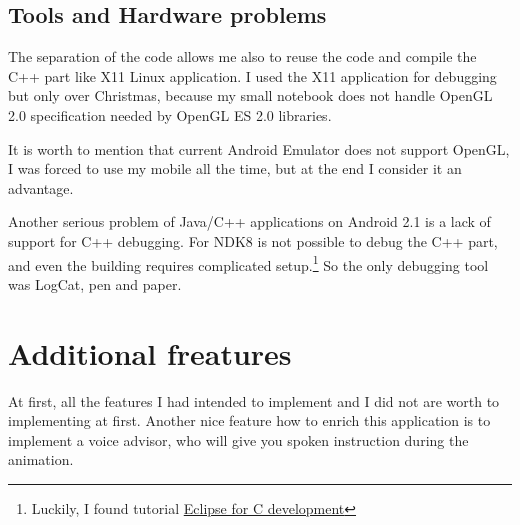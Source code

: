 \subsection*{Tools and Hardware problems} %
The separation of the code allows me also to reuse the code and compile 
the C++ part like X11 Linux application. I used the X11 application for debugging
but only over Christmas, because my small notebook does not handle OpenGL 2.0 specification
needed by OpenGL ES 2.0 libraries.

It is worth to mention that current Android Emulator does not support OpenGL, 
I was forced to use my mobile all the time, 
but at the end I consider it an advantage.

Another serious problem of Java/C++ applications on Android 2.1 is a lack of support for C++ debugging.
For NDK8 is not possible to debug the C++ part, 
and even the building requires complicated setup.\footnote{Luckily, I found tutorial \href{http://mhandroid.wordpress.com/2011/01/23/using-eclipse-for-android-cc-development/}{Eclipse for C development} }
So the only debugging tool was LogCat, pen and paper.

\section*{Additional freatures} %
\label{sec:Additional freatures}
At first, all the features I had intended to implement and I did not are worth to implementing at first.
Another nice feature how to enrich this application is to implement
a voice advisor, who will give you spoken instruction during the animation.

